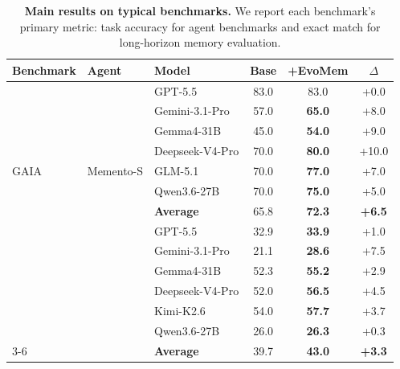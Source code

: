 \documentclass{llmxive}
\providecommand{\arraystretch}{1.05}
\begin{document}
\begin{table}[t]
\centering
\setlength{\tabcolsep}{3.5pt}
\renewcommand{\arraystretch}{0.95}
\begin{tabular}{lllccc}
\toprule
\textbf{Benchmark} & \textbf{Agent} & \textbf{Model} & \textbf{Base} & \textbf{+EvoMem} & \textbf{$\Delta$} \\
\midrule

\multirow{9}{*}{GAIA}
& \multirow{9}{*}{Memento-S}
& GPT-5.5 & 83.0 & 83.0 & +0.0 \\
& & Gemini-3.1-Pro & 57.0 & \textbf{65.0} & +8.0 \\
& & Gemma4-31B & 45.0 & \textbf{54.0} & +9.0 \\
& & Deepseek-V4-Pro & 70.0 & \textbf{80.0} & +10.0 \\
& & GLM-5.1 & 70.0 & \textbf{77.0} & +7.0 \\
& & Qwen3.6-27B & 70.0 & \textbf{75.0} & +5.0 \\
\cmidrule(l){3-6}
& & \textbf{Average} & 65.8 & \textbf{72.3} & \textbf{+6.5} \\
\cmidrule(l){1-6}

\multirow{9}{*}{LoCoMo}
& \multirow{9}{*}{A-Mem}
& GPT-5.5 & 32.9 & \textbf{33.9} & +1.0 \\
& & Gemini-3.1-Pro & 21.1 & \textbf{28.6} & +7.5 \\

& & Gemma4-31B & 52.3 & \textbf{55.2} & +2.9 \\
& & Deepseek-V4-Pro & 52.0 & \textbf{56.5} & +4.5 \\
& & Kimi-K2.6 & 54.0 & \textbf{57.7} & +3.7 \\
& & Qwen3.6-27B & 26.0 & \textbf{26.3} & +0.3 \\
\cmidrule(l){3-6}
& & \textbf{Average} & 39.7 & \textbf{43.0} & \textbf{+3.3} \\

\bottomrule
\end{tabular}
\vspace{-3mm}
\label{tab:typical_results}
\caption{\small
\textbf{Main results on typical benchmarks.}
We report each benchmark's primary metric: task accuracy for agent benchmarks and exact match for long-horizon memory evaluation.
}
\end{table}
\end{document}
